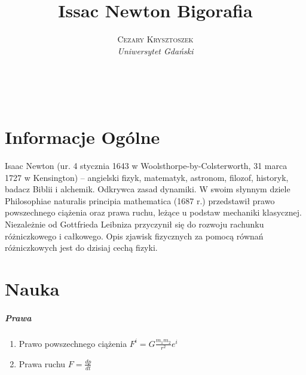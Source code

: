 \documentclass[a4paper, 11pt]{article}
\title{\textbf{Issac Newton}
Bigorafia}
\author{\textsc{Cezary Krysztoszek} 
\\{\textit{Uniwersytet Gdański}}}
\makeatletter
\renewcommand{\maketitle}{ 
\begin{flushright} 
{\LARGE\@title} 
\vspace{40pt}
{\large\@author} 
\\\@date 
\vspace{50pt} 
\end{flushright}
}
\makeatother
\begin{document}
\maketitle 

\section*{Informacje Ogólne}
Isaac Newton (ur. 4 stycznia 1643 w Woolsthorpe-by-Colsterworth, 31 marca 1727 w Kensington) – angielski fizyk, matematyk, astronom, filozof, historyk, badacz Biblii i alchemik. Odkrywca zasad dynamiki.
W swoim słynnym dziele Philosophiae naturalis principia mathematica (1687 r.) przedstawił prawo powszechnego ciążenia oraz prawa ruchu, leżące u podstaw mechaniki klasycznej. Niezależnie od Gottfrieda Leibniza przyczynił się do rozwoju rachunku różniczkowego i całkowego. Opis zjawisk fizycznych za pomocą równań różniczkowych jest do dzisiaj cechą fizyki.

\section*{Nauka}
\subparagraph{Prawa} 
\begin{enumerate}
\item Prawo powszechnego ciążenia 
\newline
\begin{math}
F^i = G\frac{m^{}_{1}{m^{}_{2}}}{r^2}e^i
\end{math}
 \item Prawa ruchu
 \newline
 \begin{math}
 F=\frac{dp}{dt}
\end{math}
\end{enumerate}
\end{document}
